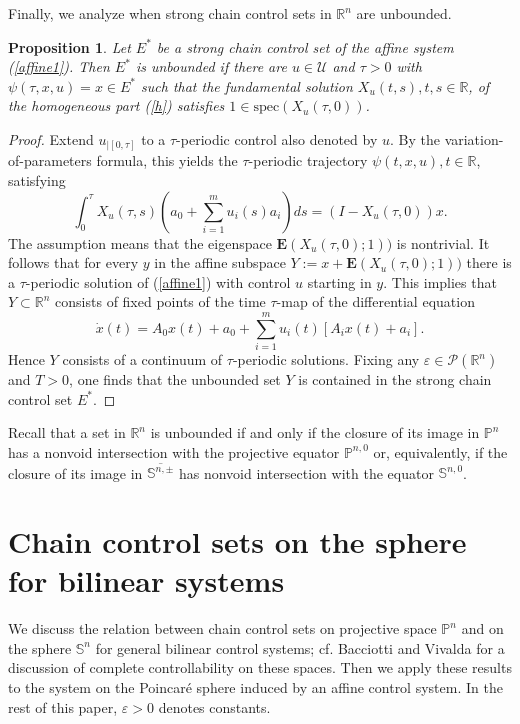 \documentclass[preprint,12pt]{elsarticle}
\newtheorem{proposition}{Proposition}
\begin{document}
Finally, we analyze when strong chain control sets in $\mathbb{R}^{n}$ are unbounded.

\begin{proposition}
\label{Proposition_unbounded}Let $E^{\ast}$ be a strong chain control set of
the affine system (\ref{affine1}). Then $E^{\ast}$ is unbounded if there are
$u\in\mathcal{U}$ and $\tau>0$ with $\psi(\tau,x,u)=x\in E^{\ast}$ such that
the fundamental solution $X_{u}(t,s),t,s\in\mathbb{R}$, of the homogeneous
part (\ref{h}) satisfies $1\in\mathrm{spec}(X_{u}(\tau,0))$.
\end{proposition}

\begin{proof}
Extend $u_{\left\vert [0,\tau]\right.  }$ to a $\tau$-periodic control also
denoted by $u$. By the variation-of-parameters formula, this yields the $\tau
$-periodic trajectory $\psi(t,x,u),t\in\mathbb{R}$, satisfying%
\[
\int_{0}^{\tau}X_{u}(\tau,s)\left(  a_{0}+\sum_{i=1}^{m}u_{i}(s)a_{i}\right)
ds=(I-X_{u}(\tau,0))x.
\]
The assumption means that the eigenspace $\mathbf{E}(X_{u}(\tau,0);1))$ is
nontrivial. It follows that for every $y$ in the affine subspace
$Y:=x+\mathbf{E}(X_{u}(\tau,0);1))$ there is a $\tau$-periodic solution of
(\ref{affine1}) with control $u$ starting in $y$. This implies that
$Y\subset\mathbb{R}^{n}$ consists of fixed points of the time $\tau$-map of
the differential equation%
\[
\dot{x}(t)=A_{0}x(t)+a_{0}+\sum_{i=1}^{m}u_{i}(t)[A_{i}x(t)+a_{i}].
\]
Hence $Y$ consists of a continuum of $\tau$-periodic solutions. Fixing any
$\varepsilon\in\mathcal{P}(\mathbb{R}^{n})$ and $T>0$, one finds that the
unbounded set $Y$ is contained in the strong chain control set $E^{\ast}$.
\end{proof}

Recall that a set in $\mathbb{R}^{n}$ is unbounded if and only if the closure
of its image in $\mathbb{P}^{n}$ has a nonvoid intersection with the
projective equator $\mathbb{P}^{n,0}$ or, equivalently, if the closure of its
image in $\overline{\mathbb{S}^{n,\pm}}$ has nonvoid intersection with the
equator $\mathbb{S}^{n,0}$.

\section{Chain control sets on the sphere for bilinear systems\label{Section5}%
}

We discuss the relation between chain control sets on projective space
$\mathbb{P}^{n}$ and on the sphere $\mathbb{S}^{n}$ for general bilinear
control systems; cf. Bacciotti and Vivalda \cite{BacV13} for a discussion of
complete controllability on these spaces. Then we apply these results to the
system on the Poincar\'{e} sphere induced by an affine control system. In the
rest of this paper, $\varepsilon>0$ denotes constants.
\end{document}
